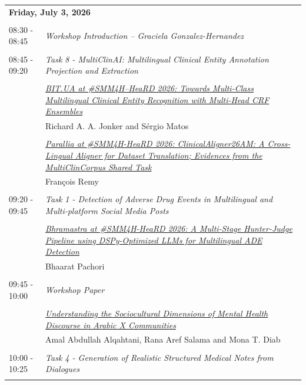 \documentclass[11pt,oneside]{book}
\begin{document}
        \begin{tabular}{p{24mm}p{124mm}}
    \multicolumn{2}{l}{\bf Friday, July 3, 2026 } \\\\
                08:30 - 08:45 & \emph{Workshop Introduction -- Graciela Gonzalez-Hernandez}\\\\
      
                      08:45 - 09:20 & \emph{Task 8 - MultiClinAI: Multilingual Clinical Entity Annotation Projection and Extraction}\\\\
      
                
                      & \hyperlink{page.41}{\emph{BIT.UA at \#SMM4H–HeaRD 2026: Towards Multi-Class Multilingual Clinical Entity Recognition with Multi-Head CRF Ensembles}}\\
        & Richard A. A. Jonker\index{Jonker} and Sérgio Matos\index{Matos}\\\\
                
                      & \hyperlink{page.165}{\emph{Parallia at \#SMM4H-HeaRD 2026: ClinicalAligner26AM: A Cross-Lingual Aligner for Dataset Translation; Evidences from the MultiClinCorpus Shared Task}}\\
        & François Remy\index{Remy}\\\\
                      09:20 - 09:45 & \emph{Task 1 - Detection of Adverse Drug Events in Multilingual and Multi-platform Social Media Posts}\\\\
      
                
                      & \hyperlink{page.49}{\emph{Bhramastra at \#SMM4H-HeaRD 2026: A Multi-Stage Hunter-Judge Pipeline using DSPy-Optimized LLMs for Multilingual ADE Detection}}\\
        & Bhaarat Pachori\index{Pachori}\\\\
                      09:45 - 10:00 & \emph{Workshop Paper}\\\\
      
                
                      & \hyperlink{page.286}{\emph{Understanding the Sociocultural Dimensions of Mental Health Discourse in Arabic X Communities}}\\
        & Amal Abdullah Alqahtani\index{Alqahtani}, Rana Aref Salama\index{Salama} and Mona T. Diab\index{Diab}\\\\
                      10:00 - 10:25 & \emph{Task 4 - Generation of Realistic Structured Medical Notes from Dialogues}\\\\
      

\end{tabular}
\end{document}
